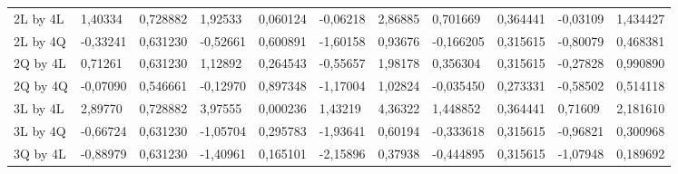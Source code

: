 \begin{table}[H]
{\begin{tabular}{lllllllllll}
\rowcolor[HTML]{FFFFFF} 
2L by 4L       & {\color[HTML]{333333} 1,40334}  & {\color[HTML]{333333} 0,728882} & {\color[HTML]{333333} 1,92533}  & {\color[HTML]{333333} 0,060124} & {\color[HTML]{333333} -0,06218} & {\color[HTML]{333333} 2,86885}  & {\color[HTML]{333333} 0,701669}  & {\color[HTML]{333333} 0,364441} & {\color[HTML]{333333} -0,03109} & {\color[HTML]{333333} 1,434427}  \\
\rowcolor[HTML]{FFFFFF} 
2L by 4Q       & {\color[HTML]{333333} -0,33241} & {\color[HTML]{333333} 0,631230} & {\color[HTML]{333333} -0,52661} & {\color[HTML]{333333} 0,600891} & {\color[HTML]{333333} -1,60158} & {\color[HTML]{333333} 0,93676}  & {\color[HTML]{333333} -0,166205} & {\color[HTML]{333333} 0,315615} & {\color[HTML]{333333} -0,80079} & {\color[HTML]{333333} 0,468381}  \\
\rowcolor[HTML]{FFFFFF} 
2Q by 4L       & {\color[HTML]{333333} 0,71261}  & {\color[HTML]{333333} 0,631230} & {\color[HTML]{333333} 1,12892}  & {\color[HTML]{333333} 0,264543} & {\color[HTML]{333333} -0,55657} & {\color[HTML]{333333} 1,98178}  & {\color[HTML]{333333} 0,356304}  & {\color[HTML]{333333} 0,315615} & {\color[HTML]{333333} -0,27828} & {\color[HTML]{333333} 0,990890}  \\
\rowcolor[HTML]{FFFFFF} 
2Q by 4Q       & {\color[HTML]{333333} -0,07090} & {\color[HTML]{333333} 0,546661} & {\color[HTML]{333333} -0,12970} & {\color[HTML]{333333} 0,897348} & {\color[HTML]{333333} -1,17004} & {\color[HTML]{333333} 1,02824}  & {\color[HTML]{333333} -0,035450} & {\color[HTML]{333333} 0,273331} & {\color[HTML]{333333} -0,58502} & {\color[HTML]{333333} 0,514118}  \\
\rowcolor[HTML]{FFFFFF} 
3L by 4L       & {\color[HTML]{FF0000} 2,89770}  & {\color[HTML]{FF0000} 0,728882} & {\color[HTML]{FF0000} 3,97555}  & {\color[HTML]{FF0000} 0,000236} & {\color[HTML]{FF0000} 1,43219}  & {\color[HTML]{FF0000} 4,36322}  & {\color[HTML]{FF0000} 1,448852}  & {\color[HTML]{FF0000} 0,364441} & {\color[HTML]{FF0000} 0,71609}  & {\color[HTML]{FF0000} 2,181610}  \\
\rowcolor[HTML]{FFFFFF} 
3L by 4Q       & {\color[HTML]{333333} -0,66724} & {\color[HTML]{333333} 0,631230} & {\color[HTML]{333333} -1,05704} & {\color[HTML]{333333} 0,295783} & {\color[HTML]{333333} -1,93641} & {\color[HTML]{333333} 0,60194}  & {\color[HTML]{333333} -0,333618} & {\color[HTML]{333333} 0,315615} & {\color[HTML]{333333} -0,96821} & {\color[HTML]{333333} 0,300968}  \\
\rowcolor[HTML]{FFFFFF} 
3Q by 4L       & {\color[HTML]{333333} -0,88979} & {\color[HTML]{333333} 0,631230} & {\color[HTML]{333333} -1,40961} & {\color[HTML]{333333} 0,165101} & {\color[HTML]{333333} -2,15896} & {\color[HTML]{333333} 0,37938}  & {\color[HTML]{333333} -0,444895} & {\color[HTML]{333333} 0,315615} & {\color[HTML]{333333} -1,07948} & {\color[HTML]{333333} 0,189692}  \\

\end{tabular}}
\end{table}
